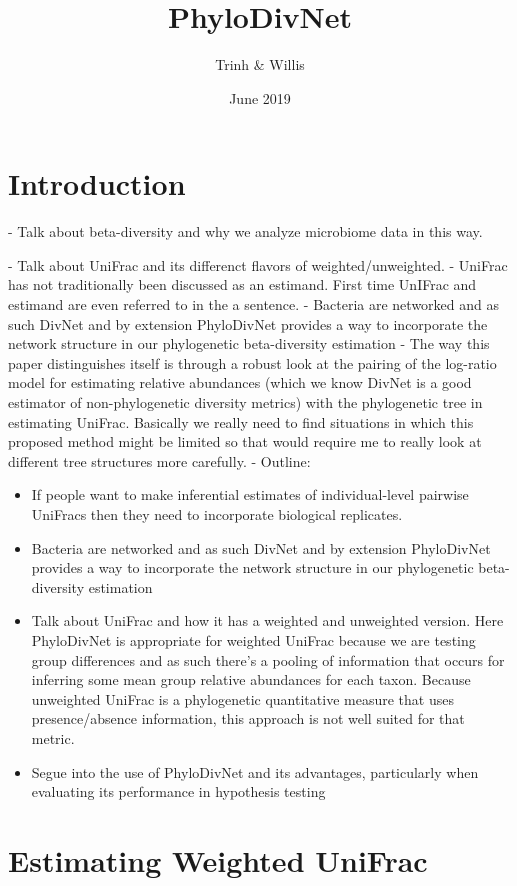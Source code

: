 \documentclass{article}
\title{PhyloDivNet}
\author{Trinh & Willis}
\date{June 2019}
\begin{document}
\maketitle
\section{Introduction}
- Talk about beta-diversity and why we analyze microbiome data in this way.

- Talk about UniFrac and its differenct flavors of weighted/unweighted.
- UniFrac has not traditionally been discussed as an estimand. First time UnIFrac and estimand are even referred to in the a sentence.
- Bacteria are networked and as such DivNet and by extension PhyloDivNet provides a way to incorporate the network structure in our phylogenetic beta-diversity estimation
- The way this paper distinguishes itself is through a robust look at the pairing of the log-ratio model for estimating relative abundances (which we know DivNet is a good estimator of non-phylogenetic diversity metrics) with the phylogenetic tree in estimating UniFrac. Basically we really need to find situations in which this proposed method might be limited so that would require me to really look at different tree structures more carefully.
-
Outline:
\begin{itemize}
  \item  If people want to make inferential estimates of individual-level pairwise UniFracs then they need to incorporate biological replicates.
  \item  Bacteria are networked and as such DivNet and by extension PhyloDivNet provides a way to incorporate the network structure in our phylogenetic beta-diversity estimation
  \item  Talk about UniFrac and how it has a weighted and unweighted version. Here PhyloDivNet is appropriate for weighted UniFrac because we are testing group differences and as such there's a pooling of information that occurs for inferring some mean group relative abundances for each taxon. Because unweighted UniFrac is a phylogenetic quantitative measure that uses presence/absence information, this approach is not well suited for that metric.
  \item  Segue into the use of PhyloDivNet and its advantages, particularly when evaluating its performance in hypothesis testing
\end{itemize}


\section{Estimating Weighted UniFrac}
\end{document}
